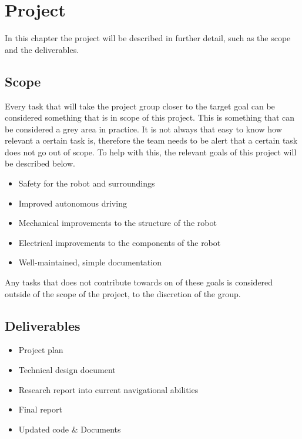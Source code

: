 \section{Project}
In this chapter the project will be described in further detail, such as the scope and the deliverables.
\subsection{Scope}
Every task that will take the project group closer to the target goal can be considered something that is in scope of this project. 
This is something that can be considered a grey area in practice. 
It is not always that easy to know how relevant a certain task is, therefore the team needs to be alert that a certain task does not go out of scope. 
To help with this, the relevant goals of this project will be described below. 
\begin{itemize}
\item Safety for the robot and surroundings
\item Improved autonomous driving
\item Mechanical improvements to the structure of the robot
\item Electrical improvements to the components of the robot
\item Well-maintained, simple documentation
\end{itemize}
Any tasks that does not contribute towards on of these goals is considered outside of the scope of the project, to the discretion of the group.

\subsection{Deliverables}
\begin{itemize}
\item Project plan
\item Technical design document
\item Research report into current navigational abilities
\item Final report
\item Updated code \& Documents 
\end{itemize}

\newpage

